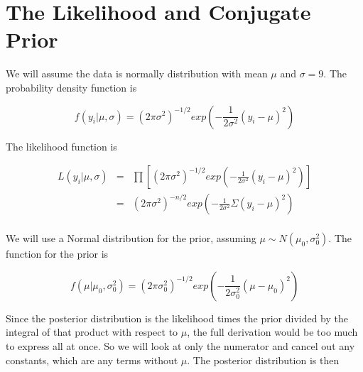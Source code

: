 \documentclass[12pt]{article}
\begin{document}
\section*{The Likelihood and Conjugate Prior}

\noindent We will assume the data is normally distribution with mean $\mu$ and $\sigma=9$.  The probability density function is

\[f(y_i|\mu,\sigma)=(2\pi\sigma^2)^{-1/2}exp\left(-\frac{1}{2\sigma^2}(y_i-\mu)^2\right)\]

\noindent The likelihood function is

\begin{eqnarray*}
L(y_i|\mu,\sigma) &=& \prod\left[(2\pi\sigma^2)^{-1/2}exp\left(-\frac{1}{2\sigma^2}(y_i-\mu)^2\right)\right] \\
&=& (2\pi\sigma^2)^{-n/2}exp\left(-\frac{1}{2\sigma^2}\Sigma(y_i-\mu)^2\right) \\
\end{eqnarray*}

\noindent We will use a Normal distribution for the prior, assuming $\mu\sim N(\mu_0,\sigma_0^2)$.  The function for the prior is

\[f(\mu|\mu_0,\sigma_0^2)= (2\pi\sigma_0^2)^{-1/2}exp\left(-\frac{1}{2\sigma_0^2}(\mu-\mu_0)^2\right)\]

\noindent Since the posterior distribution is the likelihood times the prior divided by the integral of that product with respect to $\mu$, the full derivation would be too much to express all at once.  So we will look at only the numerator and cancel out any constants, which are any terms without $\mu$.  The posterior distribution is then
\end{document}
